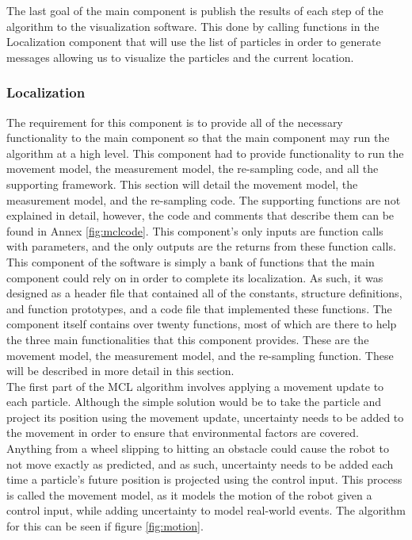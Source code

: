 \documentclass{article}
\newcommand\tab[1][0.5cm]{\hspace*{#1}}
\newcounter{subsubsubsection}[subsubsection]
\begin{document}
The last goal of the main component is publish the results of each step of the algorithm to the visualization software. This done by calling functions in the Localization component that will use the list of particles in order to generate messages allowing us to visualize the particles and the current location.
\subsubsection{Localization}
\tab The requirement for this component is to provide all of the necessary functionality to the main component so that the main component may run the algorithm at a high level. This component had to provide functionality to run the movement model, the measurement model, the re-sampling code, and all the supporting framework. This section will detail the movement model, the measurement model, and the re-sampling code. The supporting functions are not explained in detail, however, the code and comments that describe them can be found in Annex \ref{fig:mclcode}. This component’s only inputs are function calls with parameters, and the only outputs are the returns from these function calls.
\tab This component of the software is simply a bank of functions that the main component could rely on in order to complete its localization. As such, it was designed as a header file that contained all of the constants, structure definitions, and function prototypes, and a code file that implemented these functions. The component itself contains over twenty functions, most of which are there to help the three main functionalities that this component provides. These are the movement model, the measurement model, and the re-sampling function. These will be described in more detail in this section.\\

The first part of the MCL algorithm involves applying a movement update to each particle. Although the simple solution would be to take the particle and project its position using the movement update, uncertainty needs to be added to the movement in order to ensure that environmental factors are covered. Anything from a wheel slipping to hitting an obstacle could cause the robot to not move exactly as predicted, and as such, uncertainty needs to be added each time a particle’s future position is projected using the control input. This process is called the movement model, as it models the motion of the robot given a control input, while adding uncertainty to model real-world events. The algorithm for this can be seen if figure \ref{fig:motion}.\\
\end{document}
